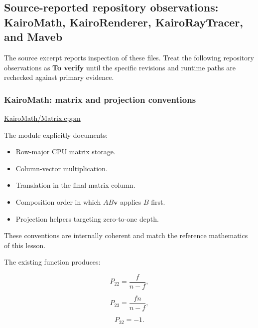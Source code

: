\subsection{Source-reported repository observations: KairoMath, KairoRenderer, KairoRayTracer, and Maveb}\label{02-foundations-ii-ch037-source-reported-repository-observations-kairomath-kairorenderer-kairoraytracer-and-maveb}

\hypertarget{02-foundations-ii-ch037-source-reported-repository-observations-kairomath-kairorenderer-kairoraytracer-and-maveb}{}

The source excerpt reports inspection of these files. Treat the following repository observations as \textbf{To verify} until the specific revisions and runtime paths are rechecked against primary evidence.

\subsubsection{KairoMath: matrix and projection conventions}\label{02-foundations-ii-ch037-kairomath-matrix-and-projection-conventions}

\hypertarget{02-foundations-ii-ch037-kairomath-matrix-and-projection-conventions}{}

\href{https://github.com/swayam8624/KairoMath/blob/master/Matrix.cppm?utm_source=chatgpt.com}{KairoMath/Matrix.cppm}

The module explicitly documents:

\begin{itemize}
\tightlist
\item
  Row-major CPU matrix storage.
\item
  Column-vector multiplication.
\item
  Translation in the final matrix column.
\item
  Composition order in which \(AB\mathbf v\) applies \(B\) first.
\item
  Projection helpers targeting zero-to-one depth.
\end{itemize}

These conventions are internally coherent and match the reference mathematics of this lesson.

The existing  function produces:

\[
 P_{22}=\frac f{n-f},
\]

\[
 P_{23}=\frac{fn}{n-f},
\]

\[
 P_{32}=-1.
\]

